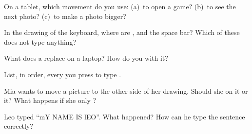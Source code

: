 \begin{exercise}[$\star$]\label{exo:g2:keyboard-and-mouse:6}
On a tablet, which movement do you use: (a)~to open a game? (b)~to see the
next photo? (c)~to make a photo bigger?
\end{exercise}

\begin{exercise}[$\star$]\label{exo:g2:keyboard-and-mouse:7}
In the drawing of the keyboard, where are ,  and the
space bar? Which of these  does not type anything?
\end{exercise}

\begin{exercise}[$\star$]\label{exo:g2:keyboard-and-mouse:8}
What does a  replace on a laptop? How do you  with it?
\end{exercise}

\begin{exercise}[$\star\star$]\label{exo:g2:keyboard-and-mouse:9}
List, in order, every  you press to type .
\end{exercise}

\begin{exercise}[$\star\star$]\label{exo:g2:keyboard-and-mouse:10}
Mia wants to move a picture to the other side of her drawing. Should she 
on it or  it? What happens if she only ?
\end{exercise}

\begin{exercise}[$\star\star$]\label{exo:g2:keyboard-and-mouse:11}
Leo typed ``mY NAME IS lEO''. What happened? How can he type the sentence
correctly?
\end{exercise}
